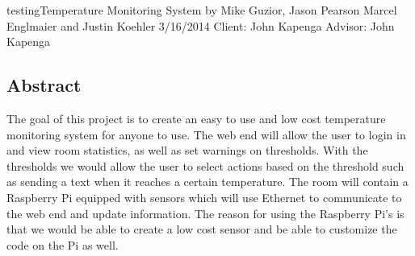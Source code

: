 \documentclass{report}
\begin{document}
\begin{titlepage}

\vspace*{\fill}
\begin{center}
testingTemperature Monitoring System \hspace*{\fill}
by Mike Guzior, Jason Pearson \hspace*{\fill}
Marcel Englmaier and Justin Koehler \hspace*{\fill}
3/16/2014 \hspace*{\fill}
Client: John Kapenga \hspace*{\fill}
Advisor: John Kapenga \hspace*{\fill}
\end{center}
\vspace*{\fill}
\end{titlepage}
\newpage
\tableofcontents
\newpage

\subsection*{Abstract}
The goal of this project is to create an easy to use and low cost temperature monitoring system for anyone to use. The web end will allow the user to login in and view room statistics, as well as set warnings on thresholds. With the thresholds we would allow the user to select actions based on the threshold such as sending a text when it reaches a certain temperature.  The room will contain a Raspberry Pi equipped with sensors which will use Ethernet to communicate to the web end and update information. The reason for using the Raspberry Pi’s is that we would be able to create a low cost sensor and be able to customize the code on the Pi as well. 
\newpage
\end{document}
